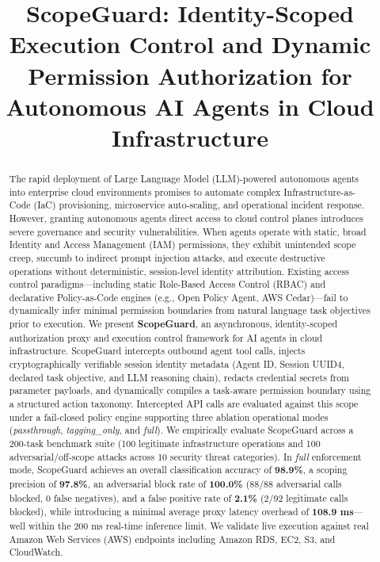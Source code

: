 \documentclass[conference]{IEEEtran}
\begin{document}
\title{ScopeGuard: Identity-Scoped Execution Control and Dynamic Permission Authorization for Autonomous AI Agents in Cloud Infrastructure}

\author{
}

\maketitle

\begin{abstract}
The rapid deployment of Large Language Model (LLM)-powered autonomous agents into enterprise cloud environments promises to automate complex Infrastructure-as-Code (IaC) provisioning, microservice auto-scaling, and operational incident response. However, granting autonomous agents direct access to cloud control planes introduces severe governance and security vulnerabilities. When agents operate with static, broad Identity and Access Management (IAM) permissions, they exhibit unintended scope creep, succumb to indirect prompt injection attacks, and execute destructive operations without deterministic, session-level identity attribution. Existing access control paradigms—including static Role-Based Access Control (RBAC) and declarative Policy-as-Code engines (e.g., Open Policy Agent, AWS Cedar)—fail to dynamically infer minimal permission boundaries from natural language task objectives prior to execution. We present \textbf{ScopeGuard}, an asynchronous, identity-scoped authorization proxy and execution control framework for AI agents in cloud infrastructure. ScopeGuard intercepts outbound agent tool calls, injects cryptographically verifiable session identity metadata (Agent ID, Session UUID4, declared task objective, and LLM reasoning chain), redacts credential secrets from parameter payloads, and dynamically compiles a task-aware permission boundary using a structured action taxonomy. Intercepted API calls are evaluated against this scope under a fail-closed policy engine supporting three ablation operational modes (\textit{passthrough}, \textit{tagging\_only}, and \textit{full}). We empirically evaluate ScopeGuard across a 200-task benchmark suite (100 legitimate infrastructure operations and 100 adversarial/off-scope attacks across 10 security threat categories). In \textit{full} enforcement mode, ScopeGuard achieves an overall classification accuracy of \textbf{98.9\%}, a scoping precision of \textbf{97.8\%}, an adversarial block rate of \textbf{100.0\%} (88/88 adversarial calls blocked, 0 false negatives), and a false positive rate of \textbf{2.1\%} (2/92 legitimate calls blocked), while introducing a minimal average proxy latency overhead of \textbf{108.9 ms}—well within the 200 ms real-time inference limit. We validate live execution against real Amazon Web Services (AWS) endpoints including Amazon RDS, EC2, S3, and CloudWatch.
\end{abstract}
\end{document}
